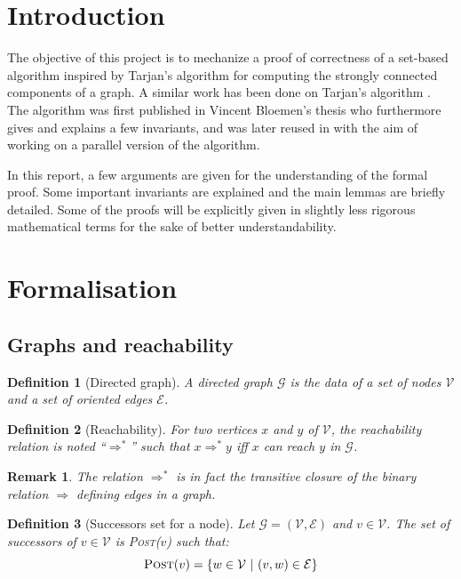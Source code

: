 \documentclass[a4 paper, 12pt]{article}
\def\GG{\ensuremath{\mathcal{G}}}
\def\VV{\ensuremath{\mathcal{V}}}
\def\EE{\ensuremath{\mathcal{E}}}
\newtheorem{definition}{Definition}
\newtheorem{remark}{Remark}
\begin{document}
\section{Introduction}

The objective of this project is to mechanize a proof of correctness of a set-based algorithm inspired by Tarjan's algorithm \cite{TarjanDFS} for computing the strongly connected components of a graph. A similar work has been done on Tarjan's algorithm \cite{TarjanMerz}. The algorithm was first published in Vincent Bloemen's thesis \cite{bloemen_strong_2019} who furthermore gives and explains a few invariants, and was later reused in \cite{bloemen_multi-core_2016} with the aim of working on a parallel version of the algorithm.

In this report, a few arguments are given for the understanding of the formal proof. Some important invariants are explained and the main lemmas are briefly detailed. Some of the proofs will be explicitly given in slightly less rigorous mathematical terms for the sake of better understandability.

\section{Formalisation}
\subsection{Graphs and reachability}
\begin{definition}[Directed graph]
    A directed graph \GG\xspace is the data of a set of nodes \VV\xspace and a set of oriented edges \EE.
\end{definition}

\begin{definition}[Reachability]
    For two vertices $x$ and $y$ of \VV, the reachability relation is noted ``$\Rightarrow^*$'' such that $x \Rightarrow^* y$ iff $x$ can reach $y$ in \GG.
\end{definition}

\begin{remark}
    The relation $\Rightarrow^*$ is in fact the transitive closure of the binary relation $\Rightarrow$ defining edges in a graph.
\end{remark}

\begin{definition}[Successors set for a node]
    Let $\mathcal{G} = (\mathcal{V}, \mathcal{E})$ and $v \in \mathcal{V}$. The set of successors of $v \in \VV$ is \textsc{Post}($v$) such that:
    \begin{equation*}
        \textsc{Post}(v) = \{w \in \VV~|~(v,w) \in \mathcal{E}\}
    \end{equation*}
\end{definition}
\end{document}
